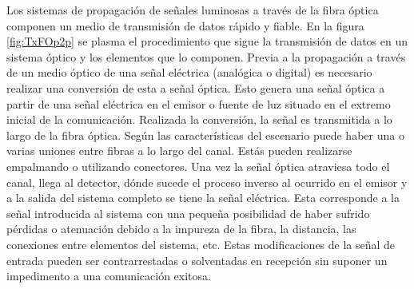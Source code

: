  Los sistemas de propagación de señales luminosas a través de la fibra óptica componen un medio de transmisión de datos rápido y fiable. En la figura \ref{fig:TxFOp2p} se plasma el procedimiento que sigue la transmisión de datos en un sistema óptico y los elementos que lo componen. Previa a la propagación a través de un medio óptico de una señal eléctrica (analógica o digital) es necesario realizar una conversión de esta a señal óptica. Esto genera una señal óptica a partir de una señal eléctrica en el emisor o fuente de luz situado en el extremo inicial de la comunicación. Realizada la conversión, la señal es transmitida a lo largo de la fibra óptica. Según las características del escenario puede haber una o varias uniones entre fibras a lo largo del canal. Estás pueden realizarse empalmando o utilizando conectores. Una vez la señal óptica atraviesa todo el canal, llega al detector, dónde sucede el proceso inverso al ocurrido en el emisor y a la salida del sistema completo se tiene la señal eléctrica. Esta corresponde a la señal introducida al sistema con una pequeña posibilidad de haber sufrido pérdidas o atenuación debido a la impureza de la fibra, la distancia, las conexiones entre elementos del sistema, etc. Estas modificaciones de la señal de entrada pueden ser contrarrestadas o solventadas en recepción sin suponer un impedimento a una comunicación exitosa.    
  
